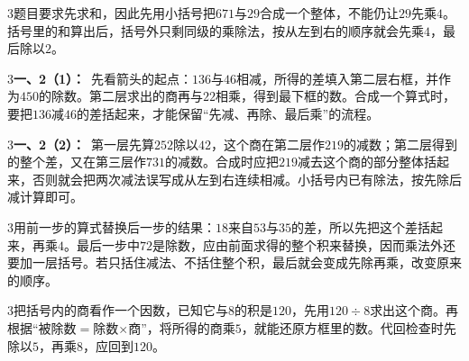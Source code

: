 \documentclass[multi=snippet,border={5bp 20bp 5bp 5bp}]{standalone}
\newenvironment{snippet}[3]{\begin{minipage}{#1bp}\color{answerred}\fontsize{#2}{#3}\selectfont\raggedright}{\end{minipage}}
\begin{document}
\begin{snippet}{505}{11.5}{14}\begin{multicols}{3}\raggedcolumns 题目要求先求和，因此先用小括号把\(671\)\allowbreak 与\(29\)\allowbreak 合成一个整体，不能仍让\(29\)\allowbreak 先乘\(4\)\allowbreak 。括号里的和算出后，括号外只剩同级的乘除法，按从左到右的顺序就会先乘\(4\)\allowbreak ，最后除以\(2\)\allowbreak 。\end{multicols}\end{snippet}
\begin{snippet}{505}{11.5}{14}\begin{multicols}{3}\raggedcolumns \textbf{一、2（1）：}\ 先看箭头的起点：\(136\)\allowbreak 与\(46\)\allowbreak 相减，所得的差填入第二层右框，并作为\(450\)\allowbreak 的除数。第二层求出的商再与\(22\)\allowbreak 相乘，得到最下框的数。合成一个算式时，要把\(136\)\allowbreak 减\(46\)\allowbreak 的差括起来，才能保留“先减、再除、最后乘”的流程。\end{multicols}\end{snippet}
\begin{snippet}{505}{11.5}{14}\begin{multicols}{3}\raggedcolumns \textbf{一、2（2）：}\ 第一层先算\(252\)\allowbreak 除以\(42\)\allowbreak ，这个商在第二层作\(219\)\allowbreak 的减数；第二层得到的整个差，又在第三层作\(731\)\allowbreak 的减数。合成时应把\(219\)\allowbreak 减去这个商的部分整体括起来，否则就会把两次减法误写成从左到右连续相减。小括号内已有除法，按先除后减计算即可。\end{multicols}\end{snippet}
\begin{snippet}{505}{11.5}{14}\begin{multicols}{3}\raggedcolumns 用前一步的算式替换后一步的结果：\(18\)\allowbreak 来自\(53\)\allowbreak 与\(35\)\allowbreak 的差，所以先把这个差括起来，再乘\(4\)\allowbreak 。最后一步中\(72\)\allowbreak 是除数，应由前面求得的整个积来替换，因而乘法外还要加一层括号。若只括住减法、不括住整个积，最后就会变成先除再乘，改变原来的顺序。\end{multicols}\end{snippet}
\begin{snippet}{505}{11.5}{14}\begin{multicols}{3}\raggedcolumns 把括号内的商看作一个因数，已知它与\(8\)\allowbreak 的积是\(120\)\allowbreak ，先用\(120\div8\)\allowbreak 求出这个商。再根据“被除数\(=\)\allowbreak 除数\(\times\)\allowbreak 商”，将所得的商乘\(5\)\allowbreak ，就能还原方框里的数。代回检查时先除以\(5\)\allowbreak ，再乘\(8\)\allowbreak ，应回到\(120\)\allowbreak 。\end{multicols}\end{snippet}
\end{document}
